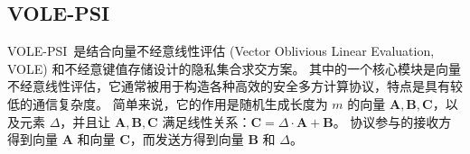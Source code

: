 
\subsection{VOLE-PSI}

VOLE-PSI~\cite{rindal2021volepsi}是结合向量不经意线性评估 (Vector Oblivious Linear Evaluation, VOLE) 和不经意键值存储设计的隐私集合求交方案。
其中的一个核心模块是向量不经意线性评估，它通常被用于构造各种高效的安全多方计算协议，特点是具有较低的通信复杂度。
简单来说，它的作用是随机生成长度为 $m$ 的向量 $\mathbf{A}, \mathbf{B}, \mathbf{C}$，以及元素 $\Delta$，并且让 $\mathbf{A}, \mathbf{B}, \mathbf{C}$ 满足线性关系：$\mathbf{C} = \Delta \cdot \mathbf{A} + \mathbf{B}$。
协议参与的接收方得到向量 $\mathbf{A}$ 和向量 $\mathbf{C}$，而发送方得到向量 $\mathbf{B}$ 和 $\Delta$。

